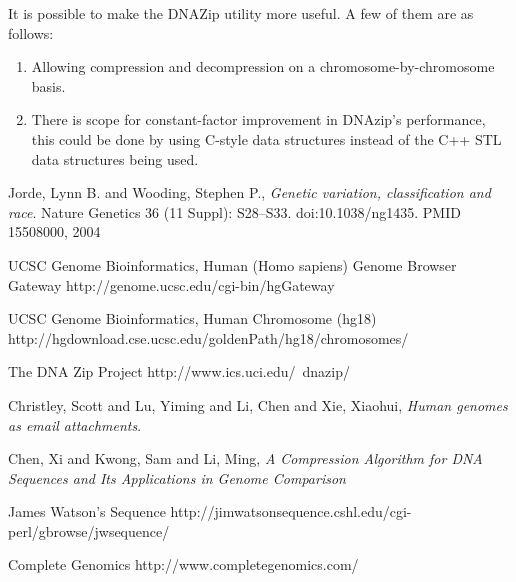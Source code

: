 \documentclass{article}
\begin{document}
It is possible to make the DNAZip utility more useful. A few of them are as
follows:

\begin{enumerate}
\item Allowing compression and decompression on a chromosome-by-chromosome
basis.

\item There is scope for constant-factor improvement in DNAzip's performance,
this could be done by using C-style data structures instead of the C++ STL data
structures being used.
\end{enumerate}

\clearpage

\begin{thebibliography}{}

  Jorde, Lynn B. and Wooding, Stephen P.,
  \emph{Genetic variation, classification and race}.
  Nature Genetics 36 (11 Suppl): S28–S33. doi:10.1038/ng1435. PMID 15508000,
  2004

  UCSC Genome Bioinformatics, Human (Homo sapiens) Genome Browser Gateway
  http://genome.ucsc.edu/cgi-bin/hgGateway

  UCSC Genome Bioinformatics, Human Chromosome (hg18)
  http://hgdownload.cse.ucsc.edu/goldenPath/hg18/chromosomes/

  The DNA Zip Project
  http://www.ics.uci.edu/~dnazip/

  Christley, Scott and Lu, Yiming and Li, Chen and Xie, Xiaohui,
  \emph{Human genomes as email attachments}.

  Chen, Xi and Kwong, Sam and Li, Ming,
  \emph{A Compression Algorithm for DNA Sequences and Its Applications in Genome Comparison}
 
  James Watson's Sequence
  http://jimwatsonsequence.cshl.edu/cgi-perl/gbrowse/jwsequence/

  Complete Genomics
  http://www.completegenomics.com/ 
\end{thebibliography}
\end{document}
